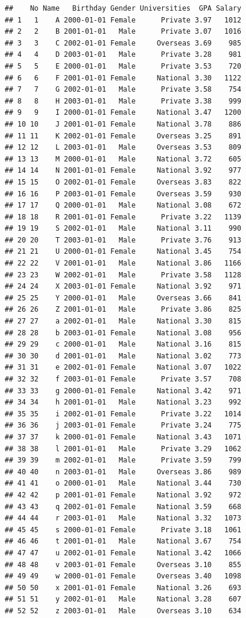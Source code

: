 \documentclass[
]{book}
\begin{document}
\begin{verbatim}
##    No Name   Birthday Gender Universities  GPA Salary
## 1   1    A 2000-01-01 Female      Private 3.97   1012
## 2   2    B 2001-01-01   Male      Private 3.07   1016
## 3   3    C 2002-01-01 Female     Overseas 3.69    985
## 4   4    D 2003-01-01   Male      Private 3.28    981
## 5   5    E 2000-01-01   Male      Private 3.53    720
## 6   6    F 2001-01-01 Female     National 3.30   1122
## 7   7    G 2002-01-01   Male      Private 3.58    754
## 8   8    H 2003-01-01   Male      Private 3.38    999
## 9   9    I 2000-01-01 Female     National 3.47   1200
## 10 10    J 2001-01-01 Female     National 3.78    886
## 11 11    K 2002-01-01 Female     Overseas 3.25    891
## 12 12    L 2003-01-01   Male     Overseas 3.53    809
## 13 13    M 2000-01-01   Male     National 3.72    605
## 14 14    N 2001-01-01 Female     National 3.92    977
## 15 15    O 2002-01-01 Female     Overseas 3.83    822
## 16 16    P 2003-01-01 Female     Overseas 3.59    930
## 17 17    Q 2000-01-01   Male     National 3.08    672
## 18 18    R 2001-01-01 Female      Private 3.22   1139
## 19 19    S 2002-01-01   Male     National 3.11    990
## 20 20    T 2003-01-01   Male      Private 3.76    913
## 21 21    U 2000-01-01 Female     National 3.45    754
## 22 22    V 2001-01-01   Male     National 3.86   1166
## 23 23    W 2002-01-01   Male      Private 3.58   1128
## 24 24    X 2003-01-01 Female     National 3.92    971
## 25 25    Y 2000-01-01   Male     Overseas 3.66    841
## 26 26    Z 2001-01-01   Male      Private 3.86    825
## 27 27    a 2002-01-01   Male     National 3.30    815
## 28 28    b 2003-01-01 Female     National 3.08    956
## 29 29    c 2000-01-01   Male     National 3.16    815
## 30 30    d 2001-01-01   Male     National 3.02    773
## 31 31    e 2002-01-01 Female     National 3.07   1022
## 32 32    f 2003-01-01 Female      Private 3.57    708
## 33 33    g 2000-01-01 Female     National 3.42    971
## 34 34    h 2001-01-01   Male     National 3.23    992
## 35 35    i 2002-01-01 Female      Private 3.22   1014
## 36 36    j 2003-01-01 Female      Private 3.24    775
## 37 37    k 2000-01-01 Female     National 3.43   1071
## 38 38    l 2001-01-01   Male      Private 3.29   1062
## 39 39    m 2002-01-01   Male      Private 3.59    799
## 40 40    n 2003-01-01   Male     Overseas 3.86    989
## 41 41    o 2000-01-01   Male     National 3.44    730
## 42 42    p 2001-01-01 Female     National 3.92    972
## 43 43    q 2002-01-01 Female     National 3.59    668
## 44 44    r 2003-01-01   Male     National 3.32   1073
## 45 45    s 2000-01-01 Female      Private 3.18   1061
## 46 46    t 2001-01-01   Male     National 3.67    754
## 47 47    u 2002-01-01 Female     National 3.42   1066
## 48 48    v 2003-01-01 Female     Overseas 3.10    855
## 49 49    w 2000-01-01 Female     Overseas 3.40   1098
## 50 50    x 2001-01-01 Female     National 3.26    693
## 51 51    y 2002-01-01   Male     National 3.28    607
## 52 52    z 2003-01-01   Male     Overseas 3.10    634
\end{verbatim}
\end{document}
